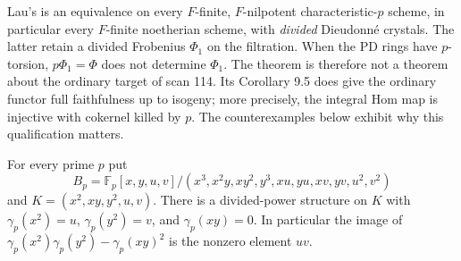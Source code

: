 \begin{remark}
\label{B:divided-target}
Lau's \cite[Theorem 9.3]{B:LauDivided} is an equivalence on every
$F$-finite, $F$-nilpotent characteristic-$p$ scheme, in particular
every $F$-finite noetherian scheme, with \emph{divided} Dieudonn\'e
crystals. The latter retain a divided Frobenius $\Phi_1$ on the
filtration. When the PD rings have $p$-torsion, $p\Phi_1=\Phi$ does
not determine $\Phi_1$. The theorem is therefore not a theorem about
the ordinary target of scan 114. Its Corollary 9.5 does give the
ordinary functor full faithfulness up to isogeny; more precisely,
the integral Hom map is injective with cokernel killed by $p$.
The counterexamples below exhibit why this qualification matters.
\end{remark}

\begin{lemma}
\label{B:finite-PD}
For every prime $p$ put
\[
 B_p=\mathbb F_p[x,y,u,v]/
 (x^3,x^2y,xy^2,y^3,xu,yu,xv,yv,u^2,v^2)
\]
and $K=(x^2,xy,y^2,u,v)$. There is a divided-power structure on $K$
with $\gamma_p(x^2)=u$, $\gamma_p(y^2)=v$, and
$\gamma_p(xy)=0$. In particular the image of
$\gamma_p(x^2)\gamma_p(y^2)-\gamma_p(xy)^2$ is the nonzero element $uv$.
\end{lemma}

